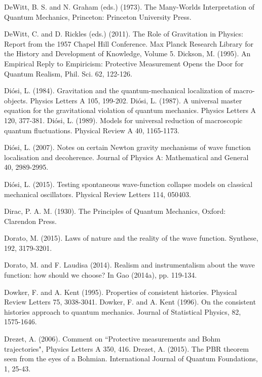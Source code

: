 \begin{thebibliography}{}
\bibitem{} DeWitt, B. S. and N. Graham (eds.) (1973). The Many-Worlds Interpretation of Quantum Mechanics, Princeton: Princeton University Press. 

\bibitem{} DeWitt, C. and D. Rickles (eds.) (2011). The Role of Gravitation in Physics: Report from the 1957 Chapel Hill Conference. Max Planck Research Library for the History and Development of Knowledge, Volume 5.
\bibitem{} Dickson, M. (1995). An Empirical Reply to Empiricism: Protective Measurement Opens the Door for Quantum Realism, Phil. Sci. 62, 122-126.

\bibitem{} Di\'{o}si, L. (1984). Gravitation and the quantum-mechanical localization of macro-objects. Physics Letters A 105, 199-202.
\bibitem{} Di\'{o}si, L. (1987). A universal master equation for the gravitational violation of quantum mechanics. Physics Letters A 120, 377-381.
\bibitem{} Di\'{o}si, L. (1989). Models for universal reduction of macroscopic quantum fluctuations. Physical Review A 40, 1165-1173.

\bibitem{} Di\'{o}si, L.  (2007). Notes on certain Newton gravity mechanisms of wave function localisation and decoherence. Journal of Physics A: Mathematical and General 40, 2989-2995.

\bibitem{} Di\'{o}si, L. (2015). Testing spontaneous wave-function collapse models on classical mechanical oscillators. Physical Review Letters 114, 050403.

\bibitem{} Dirac, P. A. M. (1930). The Principles of Quantum Mechanics, Oxford: Clarendon Press.

\bibitem{} Dorato, M. (2015). Laws of nature and the reality of the wave function. Synthese, 192, 3179-3201.

\bibitem{} Dorato, M. and F. Laudisa (2014). Realism and instrumentalism about the wave function: how should we choose? In Gao (2014a), pp. 119-134.

\bibitem{} Dowker, F. and A. Kent (1995). Properties of consistent histories. Physical Review Letters 75, 3038-3041. 
\bibitem{}  Dowker, F. and A. Kent (1996). On the consistent histories approach to quantum mechanics. Journal of Statistical Physics, 82, 1575-1646.

\bibitem{} Drezet, A. (2006). Comment on ``Protective measurements and Bohm trajectories", Physics Letters A 350, 416.
\bibitem{} Drezet, A. (2015). The PBR theorem seen from the eyes of a Bohmian. International Journal of Quantum Foundations, 1, 25-43.



\end{thebibliography}
